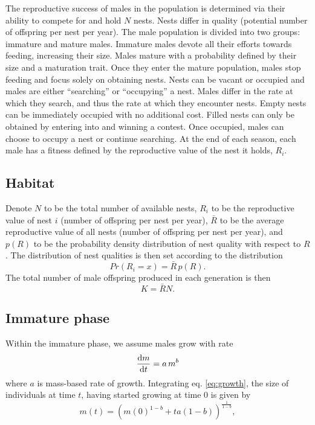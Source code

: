 \documentclass[a4paper,11pt]{article}
\begin{document}
The reproductive success of males in the population is determined via their ability to compete for and hold $N$ nests. Nests differ in quality (potential number of offspring per nest per year). The male population is divided into two groups: immature and mature males. Immature males devote all their efforts towards feeding, increasing their size. Males mature with a probability defined by their size and a maturation trait. Once they enter the mature population, males stop feeding and focus solely on obtaining nests. Nests can be vacant or occupied and males are either ``searching'' or ``occupying'' a nest. Males differ in the rate at which they search, and thus the rate at which they encounter nests. Empty nests can be immediately occupied with no additional cost. Filled nests can only be obtained by entering into and winning a contest. Once occupied, males can choose to occupy a nest or continue searching. At the end of each season, each male has a fitness defined by the reproductive value of the nest it holds, $R_i$.

\subsection{Habitat}

Denote $N$ to be the total number of available nests, $R_i$ to be the reproductive value of nest $i$ (number of offspring per nest per year), $\bar{R}$ to be the average reproductive value of all nests (number of offspring per nest per year), and $p(R)$ to be the probability density distribution of nest quality with respect to $R$. The distribution of nest qualities is then set according to the distribution
\begin{equation} \label{eq:pdf_R}
    Pr(R_i = x) =\bar{R} \, p(R).
\end{equation}
The total number of male offspring produced in each generation is then
\begin{equation} \label{eq:pdf_R}
    K = \bar{R} N.
\end{equation}

\subsection{Immature phase}

Within the immature phase, we assume males grow with rate
\begin{equation} \label{eq:growth}
\frac{{\rm d} m}{{\rm d} t} = a \, m^ b
\end{equation}
where $a$ is mass-based rate of growth. Integrating eq. \ref{eq:growth}, the size of individuals at time $t$, having started growing at time $0$ is given by
\begin{equation} \label{eq:growth}
m(t) = \left(m(0)^{1-b} + t a(1-b)\right)^{\frac1{1-b}},
\end{equation}
\end{document}
